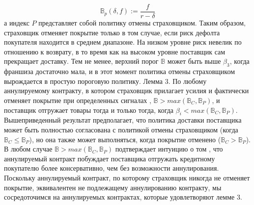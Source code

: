 \documentclass[a4paper,12pt]{article}
\begin{document}
\begin{equation}
	\mathbb{B}_{p}(\delta,f):= \frac{f}{r-\delta}
\end{equation}
а индекс $P$ представляет собой политику отмены страховщиком. Таким образом, страховщик отменяет покрытие только в том случае, если риск дефолта покупателя находится в среднем диапазоне. На низком уровне риск невелик по отношению к возврату, в то время как на высоком уровне поставщик сам прекращает доставку. Тем не менее, верхний порог $\mathbb{B}$ может быть выше $\beta_{3}$, когда франшиза достаточно мала, и в этот момент политика отмены страховщиком вырождается в простую пороговую политику.
Лемма 3. По любому аннулируемому контракту, в котором страховщик прилагает усилия и фактически отменяет покрытие при определенных сигналах , $\mathbb{B} > max(\mathbb{B}_{C}, \mathbb{B}_{P})$, и поставщик отгружает товары тогда и только тогда, когда $\beta_{i} < max(\mathbb{B}_{C}, \mathbb{B}_{P})$.
Вышеприведенный результат предполагает, что политика доставки поставщика может быть полностью согласована с политикой отмены страховщиком (когда $\mathbb{B}_{C} \leq \mathbb{B}_{P}$), но она также может выполняться, когда покрытие отменено ($\mathbb{B}_{C} > \mathbb{B}_{P}$). В любом случае $\mathbb{B} > max(\mathbb{B}_{C}, \mathbb{B}_{P})$ подтверждает интуицию о том , что аннулируемый контракт побуждает поставщика отгружать кредитному покупателю более консервативно, чем без возможности аннулирования. Поскольку аннулируемый контракт, по которому страховщик никогда не отменяет покрытие, эквивалентен не подлежащему аннулированию контракту, мы сосредоточимся на аннулируемых контрактах, которые удовлетворяют лемме 3.
\end{document}
